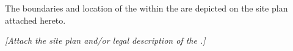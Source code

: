 \noindent The boundaries and location of the \premises within the \building are depicted on the site plan attached hereto.

\bigskip
\noindent \emph{[Attach the site plan and/or legal description of the \premises.]}
